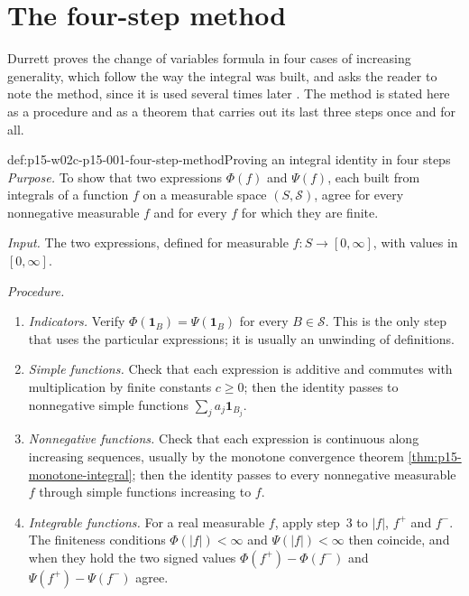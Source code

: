 \section{The four-step method}
\label{sec:p15-w02c-p15-001-four-step}

Durrett proves the change of variables formula in four cases of increasing
generality, which follow the way the integral was built, and asks the
reader to note the method, since it is used several times later
\cite[proof of thm.~1.6.9, p.~32]{DurrettPTEAuthor2019}. The method is
stated here as a procedure and as a theorem that carries out its last
three steps once and for all.

\begin{hbmethod}{def:p15-w02c-p15-001-four-step-method}{Proving an integral identity in four steps}
\emph{Purpose.} To show that two expressions \(\Phi(f)\) and \(\Psi(f)\),
each built from integrals of a function \(f\) on a measurable space
\((S,\mathcal S)\), agree for every nonnegative measurable \(f\) and for
every \(f\) for which they are finite.

\emph{Input.} The two expressions, defined for measurable
\(f:S\to[0,\infty]\), with values in \([0,\infty]\).

\emph{Procedure.}
\begin{enumerate}
\item \emph{Indicators.} Verify \(\Phi(\mathbf1_B)=\Psi(\mathbf1_B)\) for
      every \(B\in\mathcal S\). This is the only step that uses the
      particular expressions; it is usually an unwinding of definitions.
\item \emph{Simple functions.} Check that each expression is additive and
      commutes with multiplication by finite constants \(c\geq0\); then the
      identity passes to nonnegative simple functions
      \(\sum_ja_j\mathbf1_{B_j}\).
\item \emph{Nonnegative functions.} Check that each expression is
      continuous along increasing sequences, usually by the monotone
      convergence theorem \cref{thm:p15-monotone-integral}; then the
      identity passes to every nonnegative measurable \(f\) through simple
      functions increasing to \(f\).
\item \emph{Integrable functions.} For a real measurable \(f\), apply
      step~3 to \(|f|\), \(f^+\) and \(f^-\). The finiteness conditions
      \(\Phi(|f|)<\infty\) and \(\Psi(|f|)<\infty\) then coincide, and when
      they hold the two signed values \(\Phi(f^+)-\Phi(f^-)\) and
      \(\Psi(f^+)-\Psi(f^-)\) agree.
\end{enumerate}


\end{hbmethod}

